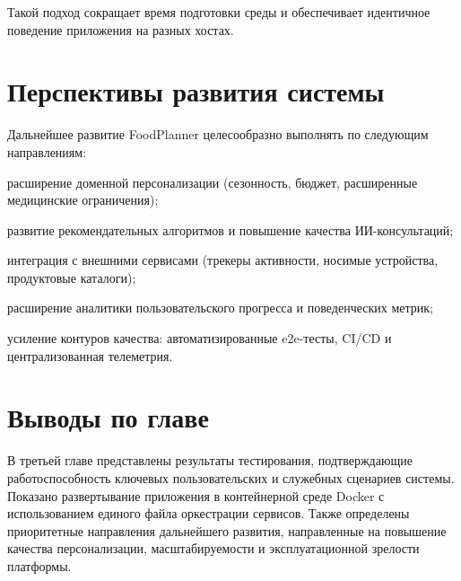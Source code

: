 Такой подход сокращает время подготовки среды и обеспечивает идентичное поведение приложения на разных хостах.

\section{Перспективы развития системы}

Дальнейшее развитие FoodPlanner целесообразно выполнять по следующим направлениям:
\begin{compactlist}
  \item расширение доменной персонализации (сезонность, бюджет, расширенные медицинские ограничения);
  \item развитие рекомендательных алгоритмов и повышение качества ИИ-консультаций;
  \item интеграция с внешними сервисами (трекеры активности, носимые устройства, продуктовые каталоги);
  \item расширение аналитики пользовательского прогресса и поведенческих метрик;
  \item усиление контуров качества: автоматизированные e2e-тесты, CI/CD и централизованная телеметрия.
\end{compactlist}

\section{Выводы по главе}

В третьей главе представлены результаты тестирования, подтверждающие работоспособность ключевых пользовательских и служебных сценариев системы. Показано развертывание приложения в контейнерной среде Docker с использованием единого файла оркестрации сервисов. Также определены приоритетные направления дальнейшего развития, направленные на повышение качества персонализации, масштабируемости и эксплуатационной зрелости платформы.